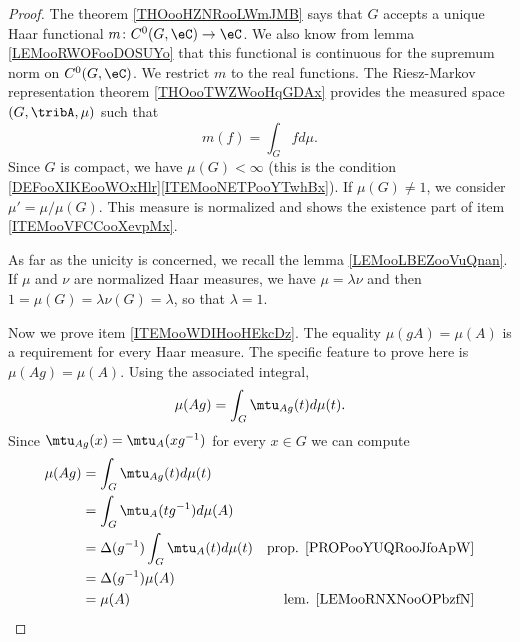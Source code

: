 \begin{proof}
	The theorem \ref{THOooHZNRooLWmJMB} says that \( G\) accepts a unique Haar functional \( m\colon C^0(G,\eC)\to \eC\). We also know from lemma \ref{LEMooRWOFooDOSUYo} that this functional is continuous for the supremum norm on \( C^0(G,\eC)\). We restrict \( m\) to the real functions. The Riesz-Markov representation theorem \ref{THOooTWZWooHqGDAx} provides the measured space \( (G, \tribA, \mu)\) such that
	\begin{equation}
		m(f)=\int_Gfd\mu.
	\end{equation}
	Since \( G\) is compact, we have \( \mu(G)<\infty\) (this is the condition \ref{DEFooXIKEooWOxHlr}\ref{ITEMooNETPooYTwhBx}). If \( \mu(G)\neq 1\), we consider \( \mu'=\mu/\mu(G)\). This measure is normalized and shows the existence part of item \ref{ITEMooVFCCooXevpMx}.

	As far as the unicity is concerned, we recall the lemma \ref{LEMooLBEZooVuQnan}. If \( \mu\) and \( \nu\) are normalized Haar measures, we have \( \mu=\lambda\nu\) and then \( 1=\mu(G)=\lambda \nu(G)=\lambda\), so that \( \lambda=1\).

	Now we prove item \ref{ITEMooWDIHooHEkcDz}. The equality \( \mu(gA)=\mu(A)\) is a requirement for every Haar measure. The specific feature to prove here is \( \mu(Ag)=\mu(A)\). Using the associated integral,
	\begin{equation}
		\mu(Ag)=\int_G\mtu_{Ag}(t)d\mu(t).
	\end{equation}
	Since \( \mtu_{Ag}(x)=\mtu_A(xg^{-1})\) for every \( x\in G\) we can compute
	\begin{subequations}
		\begin{align}
			\mu(Ag) & =\int_G\mtu_{Ag}(t)d\mu(t)                                                    \\
			        & =\int_G\mtu_A(tg^{-1})d\mu(A)                                                 \\
			        & =\Delta(g^{-1})\int_G\mtu_A(t)d\mu(t) & \text{prop. \ref{PROPooYUQRooJfoApW}} \\
			        & =\Delta(g^{-1})\mu(A)                                                         \\
			        & =\mu(A)                               & \text{lem. \ref{LEMooRNXNooOPbzfN}}
		\end{align}
	\end{subequations}


\end{proof}
